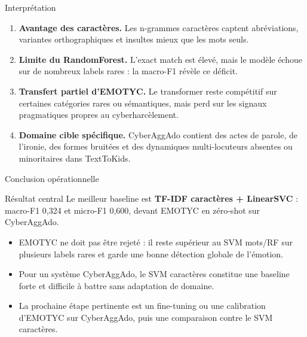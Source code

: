 \documentclass[aspectratio=169]{beamer}
\begin{document}
\begin{frame}{Interprétation}
  \begin{enumerate}
    \item \textbf{Avantage des caractères.} Les n-grammes caractères captent abréviations, variantes orthographiques et insultes mieux que les mots seuls.
    \item \textbf{Limite du RandomForest.} L'exact match est élevé, mais le modèle échoue sur de nombreux labels rares : la macro-F1 révèle ce déficit.
    \item \textbf{Transfert partiel d'EMOTYC.} Le transformer reste compétitif sur certaines catégories rares ou sémantiques, mais perd sur les signaux pragmatiques propres au cyberharcèlement.
    \item \textbf{Domaine cible spécifique.} CyberAggAdo contient des actes de parole, de l'ironie, des formes bruitées et des dynamiques multi-locuteurs absentes ou minoritaires dans TextToKids.
  \end{enumerate}
\end{frame}

\begin{frame}{Conclusion opérationnelle}
  \begin{block}{Résultat central}
    Le meilleur baseline est \textbf{TF-IDF caractères + LinearSVC} : macro-F1 0,324 et micro-F1 0,600, devant EMOTYC en zéro-shot sur CyberAggAdo.
  \end{block}

  \begin{itemize}
    \item EMOTYC ne doit pas être rejeté : il reste supérieur au SVM mots/RF sur plusieurs labels rares et garde une bonne détection globale de l'émotion.
    \item Pour un système CyberAggAdo, le SVM caractères constitue une baseline forte et difficile à battre sans adaptation de domaine.
    \item La prochaine étape pertinente est un fine-tuning ou une calibration d'EMOTYC sur CyberAggAdo, puis une comparaison contre le SVM caractères.
  \end{itemize}

\end{frame}
\end{document}
